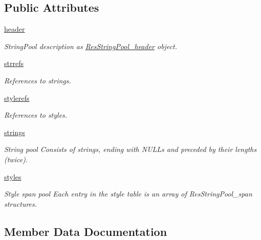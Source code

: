 \subsection*{Public Attributes}
\begin{DoxyCompactItemize}
\item 
\mbox{\label{classstringpool_1_1ResStringPool_a4c316a2e48a2e2d63757a9878a1c904c}} 
\mbox{\hyperlink{classstringpool_1_1ResStringPool_a4c316a2e48a2e2d63757a9878a1c904c}{header}}
\begin{DoxyCompactList}\small\item\em String\+Pool description as \mbox{\hyperlink{classstringpool_1_1ResStringPool__header}{Res\+String\+Pool\+\_\+header}} object. \end{DoxyCompactList}\item 
\mbox{\hyperlink{classstringpool_1_1ResStringPool_a7cd43d8421ba9f2060ad5555637245c6}{strrefs}}
\begin{DoxyCompactList}\small\item\em References to strings. \end{DoxyCompactList}\item 
\mbox{\hyperlink{classstringpool_1_1ResStringPool_a28ab464baab495dadcface0abb9b9839}{stylerefs}}
\begin{DoxyCompactList}\small\item\em References to styles. \end{DoxyCompactList}\item 
\mbox{\hyperlink{classstringpool_1_1ResStringPool_a2a5d467e9ad5d414ea401190a81becc8}{strings}}
\begin{DoxyCompactList}\small\item\em String pool Consists of strings, ending with N\+U\+L\+Ls and preceded by their lengths (twice). \end{DoxyCompactList}\item 
\mbox{\hyperlink{classstringpool_1_1ResStringPool_aebb7e52f22773bb87fc71dc79be2fb2f}{styles}}
\begin{DoxyCompactList}\small\item\em Style span pool Each entry in the style table is an array of Res\+String\+Pool\+\_\+span structures. \end{DoxyCompactList}\end{DoxyCompactItemize}


\subsection{Member Data Documentation}
\mbox{\label{classstringpool_1_1ResStringPool_a2a5d467e9ad5d414ea401190a81becc8}} 
